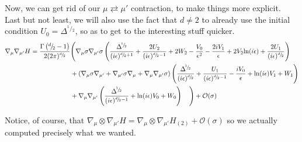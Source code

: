 \documentclass[a4paper,11pt]{article}
\numberwithin{equation}{section}
\theoremstyle{definition}
\newcommand{\dd}{{^d\!/\!_2}}
\begin{document}
Now, we can get rid of our $\mu \rightleftarrows {\mu'}$ contraction, to make things more explicit. Last but not least, we will also use the fact that $d\ne2$ to already use the initial condition $U_0=\Delta^{\!^1\!/\!_2}$, so as to get to the interesting stuff quicker.
\begin{align}
    \nabla_\mu\nabla_{\mu'} H
    = \frac{\Gamma\left(\dd -1\right)}{2 (2\pi)^\dd} &\Bigg(\nabla_\mu\sigma \nabla_{\mu'} \sigma
    \left(
      \frac{\Delta^{\!^1\!/\!_2}}{(i\epsilon)^{\dd+1}} 
    + \frac{2U_2}{(i\epsilon)^{\dd-1}}
    + 2 W_2
    - \frac{V_0}{\epsilon^2}
    - \frac{2iV_1}{\epsilon}
    +2 V_2 \mathrm{ln}(i\epsilon)
    + \frac{2U_1}{(i\epsilon)^{\dd}}
    \right)\notag \\
    &+ \left(\nabla_\mu \sigma \nabla_{\mu'} + \nabla_{\mu'} \sigma \nabla_\mu + \nabla_\mu \nabla_{\mu'} \sigma\right) \left(
      \frac{\Delta^{\!^1\!/\!_2}}{(i\epsilon)^{\dd}}  
    + \frac{U_1}{(i\epsilon)^{\dd-1}} 
    - \frac{iV_0}{\epsilon}
    + \mathrm{ln}(i\epsilon) V_1 
    + W_1
    \right)\notag \\%
    &+ \nabla_\mu \nabla_{\mu'} \left(
    \frac{\Delta^{\!^1\!/\!_2}}{(i\epsilon)^{\dd-1}} 
    + \mathrm{ln}(i\epsilon) V_0
    + W_0\right)
    \quad \Bigg) + \mathcal{O}(\sigma)
\end{align}

Notice, of course, that $\nabla_\mu\otimes\nabla_{\mu'} H = \nabla_\mu\otimes\nabla_{\mu'} H_{(2)} +\mathcal{O}(\sigma)$ so we actually computed precisely what we wanted.
\end{document}

